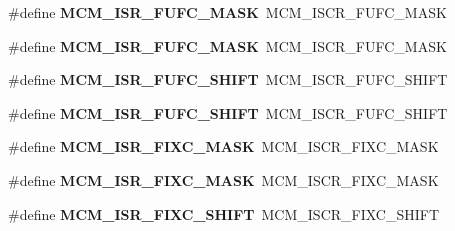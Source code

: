 \begin{DoxyCompactItemize}
\item 
\#define {\bfseries M\+C\+M\+\_\+\+I\+S\+R\+\_\+\+F\+U\+F\+C\+\_\+\+M\+A\+SK}~M\+C\+M\+\_\+\+I\+S\+C\+R\+\_\+\+F\+U\+F\+C\+\_\+\+M\+A\+SK\hypertarget{group__Backward__Compatibility__Symbols_ga57b83edf81529b3aeb0bcd71246d94db}{}\label{group__Backward__Compatibility__Symbols_ga57b83edf81529b3aeb0bcd71246d94db}

\item 
\#define {\bfseries M\+C\+M\+\_\+\+I\+S\+R\+\_\+\+F\+U\+F\+C\+\_\+\+M\+A\+SK}~M\+C\+M\+\_\+\+I\+S\+C\+R\+\_\+\+F\+U\+F\+C\+\_\+\+M\+A\+SK\hypertarget{group__Backward__Compatibility__Symbols_ga57b83edf81529b3aeb0bcd71246d94db}{}\label{group__Backward__Compatibility__Symbols_ga57b83edf81529b3aeb0bcd71246d94db}

\item 
\#define {\bfseries M\+C\+M\+\_\+\+I\+S\+R\+\_\+\+F\+U\+F\+C\+\_\+\+S\+H\+I\+FT}~M\+C\+M\+\_\+\+I\+S\+C\+R\+\_\+\+F\+U\+F\+C\+\_\+\+S\+H\+I\+FT\hypertarget{group__Backward__Compatibility__Symbols_gaba14f9ecb4d3e66eae0b4bf05d89bbdb}{}\label{group__Backward__Compatibility__Symbols_gaba14f9ecb4d3e66eae0b4bf05d89bbdb}

\item 
\#define {\bfseries M\+C\+M\+\_\+\+I\+S\+R\+\_\+\+F\+U\+F\+C\+\_\+\+S\+H\+I\+FT}~M\+C\+M\+\_\+\+I\+S\+C\+R\+\_\+\+F\+U\+F\+C\+\_\+\+S\+H\+I\+FT\hypertarget{group__Backward__Compatibility__Symbols_gaba14f9ecb4d3e66eae0b4bf05d89bbdb}{}\label{group__Backward__Compatibility__Symbols_gaba14f9ecb4d3e66eae0b4bf05d89bbdb}

\item 
\#define {\bfseries M\+C\+M\+\_\+\+I\+S\+R\+\_\+\+F\+I\+X\+C\+\_\+\+M\+A\+SK}~M\+C\+M\+\_\+\+I\+S\+C\+R\+\_\+\+F\+I\+X\+C\+\_\+\+M\+A\+SK\hypertarget{group__Backward__Compatibility__Symbols_ga6d8f4bf99ae7ee26a509ebe76c2ddb78}{}\label{group__Backward__Compatibility__Symbols_ga6d8f4bf99ae7ee26a509ebe76c2ddb78}

\item 
\#define {\bfseries M\+C\+M\+\_\+\+I\+S\+R\+\_\+\+F\+I\+X\+C\+\_\+\+M\+A\+SK}~M\+C\+M\+\_\+\+I\+S\+C\+R\+\_\+\+F\+I\+X\+C\+\_\+\+M\+A\+SK\hypertarget{group__Backward__Compatibility__Symbols_ga6d8f4bf99ae7ee26a509ebe76c2ddb78}{}\label{group__Backward__Compatibility__Symbols_ga6d8f4bf99ae7ee26a509ebe76c2ddb78}

\item 
\#define {\bfseries M\+C\+M\+\_\+\+I\+S\+R\+\_\+\+F\+I\+X\+C\+\_\+\+S\+H\+I\+FT}~M\+C\+M\+\_\+\+I\+S\+C\+R\+\_\+\+F\+I\+X\+C\+\_\+\+S\+H\+I\+FT\hypertarget{group__Backward__Compatibility__Symbols_ga2655b9e638b37e397318822fad7cf222}{}\label{group__Backward__Compatibility__Symbols_ga2655b9e638b37e397318822fad7cf222}


\end{DoxyCompactItemize}
